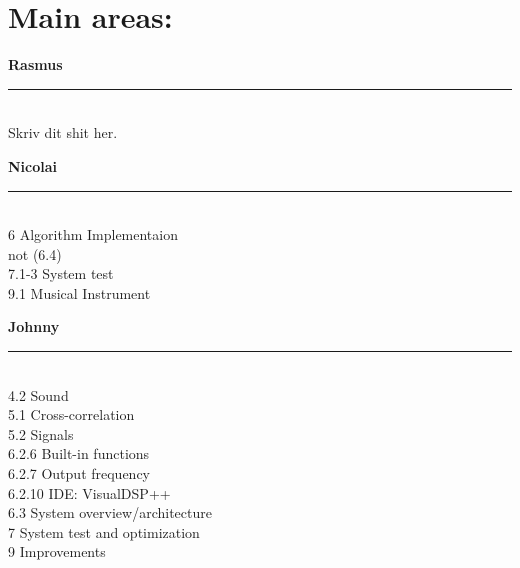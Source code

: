 \section{Main areas:}
\begin{minipage}{0.31\columnwidth}
\begin{center}
\textbf{Rasmus}
\end{center}
\hrule
\ \\
Skriv dit shit her.
\end{minipage}
\hfill
\vline
\hfill
\begin{minipage}{0.31\columnwidth}
\begin{center}
\textbf{Nicolai}
\end{center}
\hrule
\ \\
6 Algorithm Implementaion\\
 not (6.4)\\
7.1-3 System test\\
9.1 Musical Instrument\\
\end{minipage}
\hfill
\vline
\hfill
\begin{minipage}{0.31\columnwidth}
\begin{center}
\textbf{Johnny}
\end{center}
\hrule
\ \\
4.2 Sound\\
5.1 Cross-correlation\\
5.2 Signals\\
6.2.6 Built-in functions\\
6.2.7 Output frequency\\
6.2.10 IDE: VisualDSP++\\
6.3 System overview/architecture\\
7 System test and optimization\\
9 Improvements\\
\end{minipage}